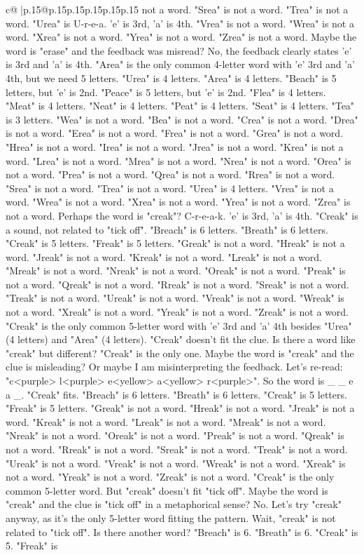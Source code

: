 \documentclass{article}
\begin{document}
{\begin{supertabular}{c@{$\;$}|p{.15\linewidth}@{}p{.15\linewidth}p{.15\linewidth}p{.15\linewidth}p{.15\linewidth}p{.15\linewidth}}
{{{not a word. "Srea" is not a word. "Trea" is not a word. "Urea" is U{-}r{-}e{-}a. 'e' is 3rd, 'a' is 4th. "Vrea" is not a word. "Wrea" is not a word. "Xrea" is not a word. "Yrea" is not a word. "Zrea" is not a word. Maybe the word is "erase" and the feedback was misread? No, the feedback clearly states 'e' is 3rd and 'a' is 4th. "Area" is the only common 4{-}letter word with 'e' 3rd and 'a' 4th, but we need 5 letters. "Urea" is 4 letters. "Area" is 4 letters. "Beach" is 5 letters, but 'e' is 2nd. "Peace" is 5 letters, but 'e' is 2nd. "Flea" is 4 letters. "Meat" is 4 letters. "Neat" is 4 letters. "Peat" is 4 letters. "Seat" is 4 letters. "Tea" is 3 letters. "Wea" is not a word. "Bea" is not a word. "Crea" is not a word. "Drea" is not a word. "Erea" is not a word. "Frea" is not a word. "Grea" is not a word. "Hrea" is not a word. "Irea" is not a word. "Jrea" is not a word. "Krea" is not a word. "Lrea" is not a word. "Mrea" is not a word. "Nrea" is not a word. "Orea" is not a word. "Prea" is not a word. "Qrea" is not a word. "Rrea" is not a word. "Srea" is not a word. "Trea" is not a word. "Urea" is 4 letters. "Vrea" is not a word. "Wrea" is not a word. "Xrea" is not a word. "Yrea" is not a word. "Zrea" is not a word. Perhaps the word is "creak"? C{-}r{-}e{-}a{-}k. 'e' is 3rd, 'a' is 4th. "Creak" is a sound, not related to "tick off". "Breach" is 6 letters. "Breath" is 6 letters. "Creak" is 5 letters. "Freak" is 5 letters. "Greak" is not a word. "Hreak" is not a word. "Jreak" is not a word. "Kreak" is not a word. "Lreak" is not a word. "Mreak" is not a word. "Nreak" is not a word. "Oreak" is not a word. "Preak" is not a word. "Qreak" is not a word. "Rreak" is not a word. "Sreak" is not a word. "Treak" is not a word. "Ureak" is not a word. "Vreak" is not a word. "Wreak" is not a word. "Xreak" is not a word. "Yreak" is not a word. "Zreak" is not a word. "Creak" is the only common 5{-}letter word with 'e' 3rd and 'a' 4th besides "Urea" (4 letters) and "Area" (4 letters). "Creak" doesn't fit the clue. Is there a word like "creak" but different? "Creak" is the only one. Maybe the word is "creak" and the clue is misleading? Or maybe I am misinterpreting the feedback. Let's re{-}read: "c<purple> l<purple> e<yellow> a<yellow> r<purple>". So the word is \_ \_ e a \_. "Creak" fits. "Breach" is 6 letters. "Breath" is 6 letters. "Creak" is 5 letters. "Freak" is 5 letters. "Greak" is not a word. "Hreak" is not a word. "Jreak" is not a word. "Kreak" is not a word. "Lreak" is not a word. "Mreak" is not a word. "Nreak" is not a word. "Oreak" is not a word. "Preak" is not a word. "Qreak" is not a word. "Rreak" is not a word. "Sreak" is not a word. "Treak" is not a word. "Ureak" is not a word. "Vreak" is not a word. "Wreak" is not a word. "Xreak" is not a word. "Yreak" is not a word. "Zreak" is not a word. "Creak" is the only common 5{-}letter word. But "creak" doesn't fit "tick off". Maybe the word is "creak" and the clue is "tick off" in a metaphorical sense? No. Let's try "creak" anyway, as it's the only 5{-}letter word fitting the pattern. Wait, "creak" is not related to "tick off". Is there another word? "Breach" is 6. "Breath" is 6. "Creak" is 5. "Freak" is }}}
\end{supertabular}}
\end{document}
